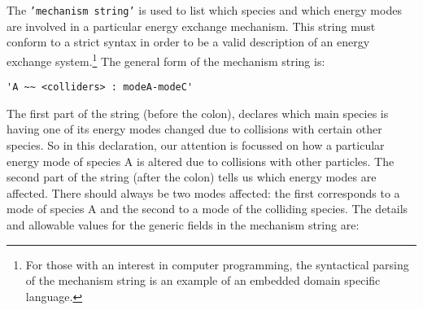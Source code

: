 The \texttt{'mechanism string'} is used to list which species and which
energy modes are involved in a particular energy exchange mechanism.
This string must conform to a strict syntax in order to be a valid
description of an energy exchange system.\footnote{For those with an interest
in computer programming, the syntactical parsing of the 
mechanism string is an example of an embedded domain specific language.}
The general form of the mechanism string is:
\begin{verbatim}
'A ~~ <colliders> : modeA-modeC'
\end{verbatim}
The first part of the string (before the colon), declares which main species
is having one of its energy modes changed due to collisions with certain
other species.
So in this declaration, our attention is focussed on how a particular
energy mode of species A is altered due to collisions with other
particles.
The second part of the string (after the colon) tells us which energy modes are
affected.
There should always be two modes affected: the first corresponds to a mode
of species A and the second to a mode of the colliding species.
The details and allowable values for the generic fields in the mechanism string are:
